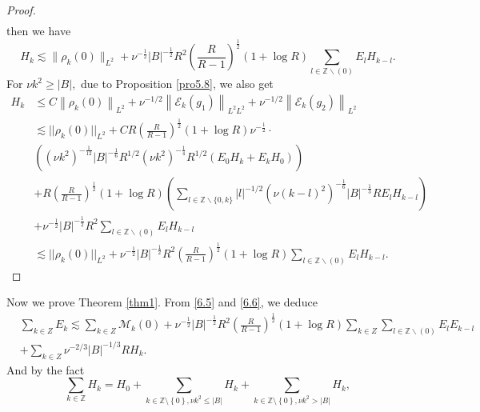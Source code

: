 \documentclass[final, 12pt,reqno]{amsart}
\numberwithin{equation}{section}
\begin{document}
\begin{proof}
\begin{equation}
\begin{aligned}
\end{aligned}
\end{equation}
then we have
$$
H_k\lesssim \|\rho_k(0)\|_{L^2}+\nu^{-\frac{1}{2}}|B|^{-\frac{1}{2}}R^2\left(\frac{R}{R-1}\right)^{\frac{1}{2}}(1+\log R)\sum_{l \in \mathbb{Z} \backslash(0)}E_lH_{k-l}.
$$
For $\nu k^2\geq |B|,$ due to Proposition \ref{pro5.8}, we also get
    \begin{equation}\label{6.24}
        \begin{aligned}
            H_k&\leq C\left\|\rho_k(0)\right\|_{L^2}+\nu^{-1/2}\left\|\mathcal{E}_k(g_1)\right\|_{L^2 L^2}
        +\nu^{-1/2}\left\|\mathcal{E}_k(g_2)\right\|_{L^2}\\
            & \lesssim||\rho_{k}(0)||_{L^2}+C R\left(\frac{R}{R-1}\right)^{\frac{1}{2}}(1+\log R)\nu^{-\frac{1}{2}}\cdot\\
   &\left( \left(\nu k^2\right)^{-\frac{1}{12}}|B|^{-\frac{1}{6}} R^{1/2} (\nu k^2)^{-\frac{1}{4}}R^{1/2}(E_0 H_k+E_kH_0)\right)\\
 &+R\left(\frac{R}{R-1}\right)^{\frac{1}{2}}(1+\log R)\left(\sum_{l \in \mathbb{Z} \backslash\{0, k\}}|l|^{-1/2}\left(\nu (k-l)^2\right)^{-\frac{1}{6}}|B|^{-\frac{1}{3}} R  E_l H_{k-l}\right)\\
 &+\nu^{-\frac{1}{2}}|B|^{-\frac{1}{2}}R^2\sum_{l \in \mathbb{Z} \backslash(0)}E_lH_{k-l}\\
            &\lesssim ||\rho_{k}(0)||_{L^2}+\nu^{-\frac{1}{2}}|B|^{-\frac{1}{2}}R^2\left(\frac{R}{R-1}\right)^{\frac{1}{2}}(1+\log R)\sum_{l \in \mathbb{Z} \backslash(0)}E_lH_{k-l}.
        \end{aligned}
    \end{equation}
\end{proof}
    Now we prove Theorem \ref{thm1}. From \eqref{6.5} and \eqref{6.6}, we deduce
    \begin{equation}\label{6.25}
        \begin{aligned}
     &\sum_{k\in Z}E_k\lesssim \sum_{k\in Z}\mathcal{M}_k(0)+\nu^{-\frac{1}{2}}|B|^{-\frac{1}{2}}R^2\left(\frac{R}{R-1}\right)^{\frac{1}{2}}(1+\log R)\sum_{k\in Z}\sum_{l \in \mathbb{Z} \backslash(0)}E_lE_{k-l}\\
     &+\sum_{k\in Z}\nu^{-2/3}|B|^{-1/3}RH_{k}.
     \end{aligned}
\end{equation}
    And by the fact
    $$\sum_{k\in\mathbb{Z}}H_k=H_0+\sum_{k\in\mathbb{Z}\setminus\left\lbrace  0\right\rbrace, \nu k^2\leq |B|}H_k+\sum_{k\in\mathbb{Z}\setminus\left\lbrace 0\right\rbrace,\nu k^2>|B|}H_k,$$
\end{document}
